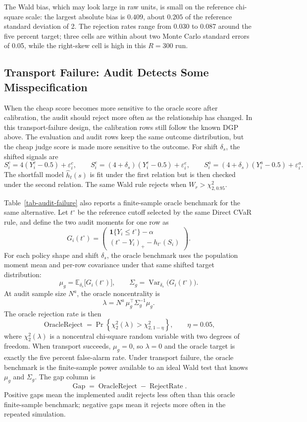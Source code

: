 \documentclass[11pt]{article}
\newcommand{\ind}{\mathbf{1}}
\begin{document}
The Wald bias, which may look large in raw units, is small on the reference
chi-square scale: the largest absolute bias is \(0.409\), about \(0.205\) of
the reference standard deviation of 2.  The rejection rates range from 0.030 to
0.087 around the five percent target; three cells are within about two Monte
Carlo standard errors of 0.05, while the right-skew cell is high in this
\(R=300\) run.

\subsection{Transport Failure: Audit Detects Some Misspecification}

When the cheap score becomes more sensitive to the oracle score after
calibration, the audit should reject more often as the relationship has changed.  In this transport-failure design,
the calibration rows still follow the known DGP above. The evaluation and
audit rows keep the same outcome distribution, but the cheap judge score is made
more sensitive to the outcome.  For shift \(\delta_s\), the shifted
signals are
\[
  S_i^c = 4(Y_i^c-0.5)+\varepsilon_i^c,
  \qquad
  S_i^e = (4+\delta_s)(Y_i^e-0.5)+\varepsilon_i^e,
  \qquad
  S_i^a = (4+\delta_s)(Y_i^a-0.5)+\varepsilon_i^a.
\]
The shortfall model \(\hat h_t(s)\) is fit under the first relation but is then
checked under the second relation.  The same Wald rule rejects when
\(W_r>\chi^2_{2,0.95}\).

Table~\ref{tab-audit-failure} also reports a finite-sample oracle benchmark for
the same alternative.  Let \(t^\circ\) be the reference cutoff selected by the
same Direct CVaR rule, and define the two audit moments for one row as
\[
  G_i(t^\circ)
  =
  \begin{pmatrix}
  \ind\{Y_i\le t^\circ\}-\alpha \\
  (t^\circ-Y_i)_+ - h_{t^\circ}(S_i)
  \end{pmatrix}.
\]
For each policy shape and shift \(\delta_s\), the oracle benchmark uses the
population moment mean and per-row covariance under that same shifted target
distribution:
\[
  \mu_g
  =
  \mathbb{E}_{\delta_s}\bigl[G_i(t^\circ)\bigr],
  \qquad
  \Sigma_g
  =
  \operatorname{Var}_{\delta_s}\bigl(G_i(t^\circ)\bigr).
\]
At audit sample size \(N^a\), the oracle noncentrality is
\[
  \lambda
  =
  N^a\,\mu_g^\top \Sigma_g^{-1}\mu_g.
\]
The oracle rejection rate is then
\[
  \operatorname{OracleReject}
  =
  \Pr\!\left\{\chi^2_2(\lambda)>\chi^2_{2,1-\eta}\right\},
  \qquad
  \eta=0.05,
\]
where \(\chi^2_2(\lambda)\) is a noncentral chi-square random variable with two
degrees of freedom.  When transport succeeds, \(\mu_g=0\), so
\(\lambda=0\) and the oracle target is exactly the five percent false-alarm
rate.  Under transport failure, the oracle benchmark is the finite-sample power
available to an ideal Wald test that knows \(\mu_g\) and \(\Sigma_g\).  The gap
column is
\[
  \operatorname{Gap}
  =
  \operatorname{OracleReject}
  -
  \operatorname{RejectRate}.
\]
Positive gaps mean the implemented audit rejects less often than this oracle
finite-sample benchmark; negative gaps mean it rejects more often in the
repeated simulation.
\end{document}
